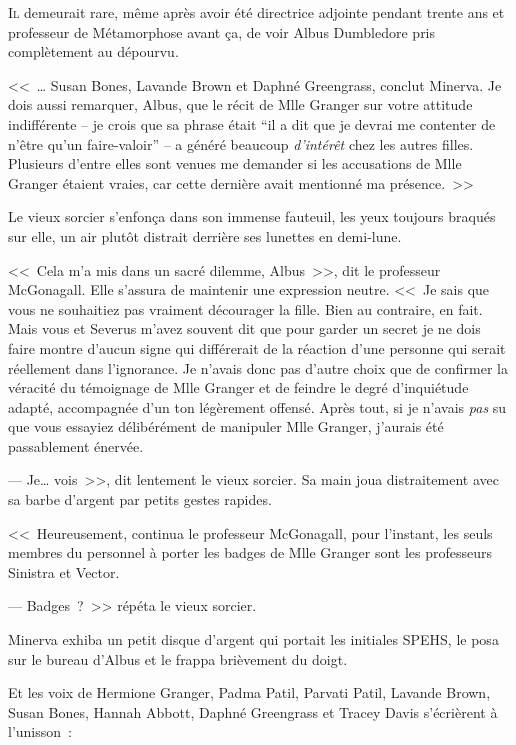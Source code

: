 
\lettrine{I}{l} demeurait rare, même après avoir été directrice adjointe pendant trente ans et professeur de Métamorphose avant ça, de voir Albus Dumbledore pris complètement au dépourvu.

<<~… Susan Bones, Lavande Brown et Daphné Greengrass, conclut Minerva. Je dois aussi remarquer, Albus, que le récit de Mlle Granger sur votre attitude indifférente -- je crois que sa phrase était “il a dit que je devrai me contenter de n'être qu'un faire-valoir” -- a généré beaucoup \emph{d'intérêt} chez les autres filles. Plusieurs d'entre elles sont venues me demander si les accusations de Mlle Granger étaient vraies, car cette dernière avait mentionné ma présence.~>>

Le vieux sorcier s'enfonça dans son immense fauteuil, les yeux toujours braqués sur elle, un air plutôt distrait derrière ses lunettes en demi-lune.

<<~Cela m'a mis dans un sacré dilemme, Albus~>>, dit le professeur McGonagall. Elle s'assura de maintenir une expression neutre. <<~Je sais que vous ne souhaitiez pas vraiment décourager la fille. Bien au contraire, en fait. Mais vous et Severus m'avez souvent dit que pour garder un secret je ne dois faire montre d'aucun signe qui différerait de la réaction d'une personne qui serait réellement dans l'ignorance. Je n'avais donc pas d'autre choix que de confirmer la véracité du témoignage de Mlle Granger et de feindre le degré d'inquiétude adapté, accompagnée d'un ton légèrement offensé. Après tout, si je n'avais \emph{pas} su que vous essayiez délibérément de manipuler Mlle Granger, j'aurais été passablement énervée.

--- Je… vois~>>, dit lentement le vieux sorcier. Sa main joua distraitement avec sa barbe d'argent par petits gestes rapides.

<<~Heureusement, continua le professeur McGonagall, pour l'instant, les seuls membres du personnel à porter les badges de Mlle Granger sont les professeurs Sinistra et Vector.

--- Badges~?~>> répéta le vieux sorcier.

Minerva exhiba un petit disque d'argent qui portait les initiales SPEHS, le posa sur le bureau d'Albus et le frappa brièvement du doigt.

Et les voix de Hermione Granger, Padma Patil, Parvati Patil, Lavande Brown, Susan Bones, Hannah Abbott, Daphné Greengrass et Tracey Davis s'écrièrent à l'unisson~:

